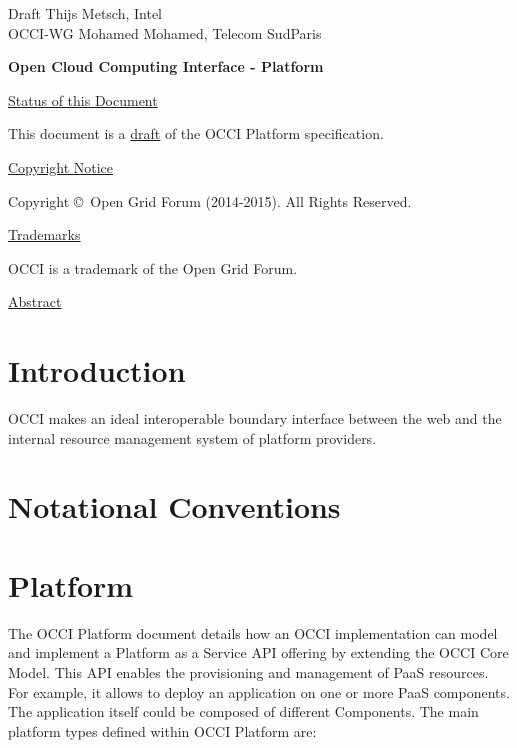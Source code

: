 \documentclass[10pt,a4paper]{article}
\begin{document}
\thispagestyle{empty}

Draft \hfill  Thijs Metsch, Intel\\
OCCI-WG \hfill  Mohamed Mohamed, Telecom SudParis\\
\rightline {\today}

\vspace*{0.5in}

\begin{Large}
\textbf{Open Cloud Computing Interface - Platform}
\end{Large}

\vspace*{0.5in}

\underline{Status of this Document}

% 

This document is a \underline{draft} of the OCCI Platform \cite{occi:platform} specification.

\underline{Copyright Notice}

Copyright \copyright ~Open Grid Forum (2014-2015). All Rights
Reserved.

\underline{Trademarks}

OCCI is a trademark of the Open Grid Forum.

\underline{Abstract}



\newpage
\tableofcontents
\newpage

\section{Introduction}


OCCI makes an ideal interoperable boundary interface between the web
and the internal resource management system of platform providers.

\section{Notational Conventions}



\section{Platform}

The OCCI Platform document details how an OCCI implementation can model and implement a Platform as a Service API offering by extending the OCCI Core Model. This API enables the provisioning and management of PaaS resources. For example, it allows to deploy an application on one or more PaaS components. The application itself could be composed of different Components. The main platform types defined within OCCI Platform are:
\end{document}
